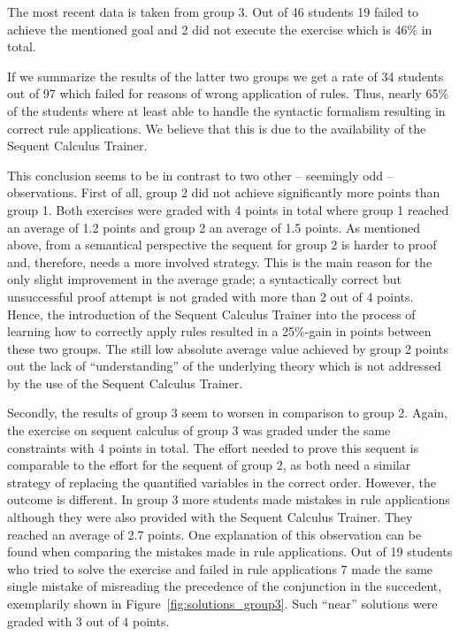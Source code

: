 \documentclass[a4paper,UKenglish]{lipics}
\begin{document}
The most recent data is taken from group 3. Out of 46 students 19 failed to achieve the mentioned goal and 2 did not execute the exercise which is 46\%
in total.

If we summarize the results of the latter two groups we get a rate of 34 students out of 97 which failed for reasons of wrong application of rules. Thus,
nearly 65\% of the students where at least able to handle the syntactic formalism resulting in correct rule applications. We believe that this is due to 
the availability of the Sequent Calculus Trainer.

This conclusion seems to be in contrast to two other -- seemingly odd -- observations. First of all, group 2 did not achieve significantly more points than group 1.
Both exercises were graded with 4 points in total where group 1 reached an average of 1.2 points and group 2 an average of 1.5 points. As mentioned 
above, from a semantical perspective the sequent for group 2 is harder to proof and, therefore, needs a more involved strategy. This is the main reason 
for the only slight improvement in the average grade; a syntactically correct but unsuccessful proof attempt is not graded with more than 2 out of 4
points. Hence, the introduction of the Sequent Calculus Trainer into the process of learning how to correctly apply rules resulted in a 25\%-gain in
points between these two groups. The still low absolute average value achieved by group 2 points out the lack of ``understanding'' of the underlying theory which is not addressed by the use of the Sequent Calculus Trainer. 

Secondly, the results of group 3 seem to worsen in comparison to group 2. Again, the exercise on sequent calculus of group 3 was graded under the same
constraints with 4 points in total. The effort needed to prove this sequent is comparable to the effort for the sequent of group 2, as both need a
similar strategy of replacing the quantified variables in the correct order. However, the outcome is different. In group 3 more students made mistakes in
rule applications although they were also provided with the Sequent Calculus Trainer. They reached an average of 2.7 points. One explanation of
this observation can be found when comparing the mistakes made in rule applications. Out of 19 students who tried to solve the exercise and failed in
rule applications 7 made the same single mistake of misreading the precedence of the conjunction in the succedent, exemplarily shown in
Figure~\ref{fig:solutions_group3}. Such ``near'' solutions were graded with 3 out of 4 points.
\end{document}
